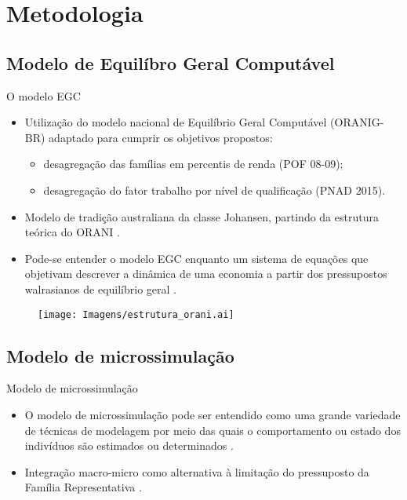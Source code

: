 \documentclass[10pt]{sintefbeamer}
\begin{document}
\section{Metodologia}

\subsection{Modelo de Equilíbro Geral Computável}

\begin{frame}{O modelo EGC}
	\begin{itemize}[<+->]
		\item Utilização do modelo nacional de Equilíbrio Geral Computável (ORANIG-BR) adaptado para cumprir os objetivos propostos:
		\begin{itemize}
			\item desagregação das famílias em percentis de renda (POF 08-09);
			\item desagregação do fator trabalho por nível de qualificação (PNAD 2015).
		\end{itemize}

		\item Modelo de tradição australiana da classe Johansen, partindo da estrutura teórica do ORANI \cite{dixit80}.

		\item Pode-se entender o modelo EGC enquanto um sistema de equações que objetivam descrever a dinâmica de uma economia a partir dos pressupostos walrasianos de equilíbrio geral \cite{horridge00}.
	\end{itemize}
\end{frame}

{
\begin{frame}[plain]
	\begin{figure}
		\texttt{[image: Imagens/estrutura\_orani.ai]} \\
		\footnotesize
	\end{figure}
\end{frame}
}


\subsection{Modelo de microssimulação}

\begin{frame}{Modelo de microssimulação}
	\begin{itemize}[<+->]
		\item O modelo de microssimulação pode ser entendido como uma grande variedade de técnicas de modelagem por meio das quais o comportamento ou estado dos indivíduos são estimados ou determinados \cite{figari15}.
		
		\item Integração macro-micro como alternativa à limitação do pressuposto da Família Representativa \cite{colombo08}.
	\end{itemize}
\end{frame}
\end{document}
